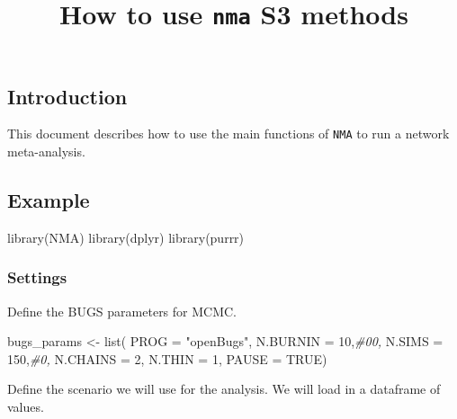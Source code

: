 \documentclass[
]{article}
\title{How to use \texttt{nma} S3 methods}
\author{}
\date{\vspace{-2.5em}}
\newenvironment{Shaded}{\begin{snugshade}}{\end{snugshade}}
\newcommand{\AttributeTok}[1]{\textcolor[rgb]{0.77,0.63,0.00}{#1}}
\newcommand{\CommentTok}[1]{\textcolor[rgb]{0.56,0.35,0.01}{\textit{#1}}}
\newcommand{\ConstantTok}[1]{\textcolor[rgb]{0.00,0.00,0.00}{#1}}
\newcommand{\DecValTok}[1]{\textcolor[rgb]{0.00,0.00,0.81}{#1}}
\newcommand{\FunctionTok}[1]{\textcolor[rgb]{0.00,0.00,0.00}{#1}}
\newcommand{\NormalTok}[1]{#1}
\newcommand{\OtherTok}[1]{\textcolor[rgb]{0.56,0.35,0.01}{#1}}
\newcommand{\StringTok}[1]{\textcolor[rgb]{0.31,0.60,0.02}{#1}}
\begin{document}
\maketitle

\hypertarget{introduction}{%
\subsection{Introduction}\label{introduction}}

This document describes how to use the main functions of \texttt{NMA} to
run a network meta-analysis.

\hypertarget{example}{%
\subsection{Example}\label{example}}

\begin{Shaded}
\begin{Highlighting}[]
\FunctionTok{library}\NormalTok{(NMA)}
\FunctionTok{library}\NormalTok{(dplyr)}
\FunctionTok{library}\NormalTok{(purrr)}
\end{Highlighting}
\end{Shaded}

\hypertarget{settings}{%
\subsubsection{Settings}\label{settings}}

Define the BUGS parameters for MCMC.

\begin{Shaded}
\begin{Highlighting}[]
\NormalTok{bugs\_params }\OtherTok{\textless{}{-}}
  \FunctionTok{list}\NormalTok{(}
    \AttributeTok{PROG =} \StringTok{"openBugs"}\NormalTok{,}
    \AttributeTok{N.BURNIN =} \DecValTok{10}\NormalTok{,}\CommentTok{\#00,}
    \AttributeTok{N.SIMS =} \DecValTok{150}\NormalTok{,}\CommentTok{\#0,}
    \AttributeTok{N.CHAINS =} \DecValTok{2}\NormalTok{,}
    \AttributeTok{N.THIN =} \DecValTok{1}\NormalTok{,}
    \AttributeTok{PAUSE =} \ConstantTok{TRUE}\NormalTok{)}
\end{Highlighting}
\end{Shaded}

Define the scenario we will use for the analysis. We will load in a
dataframe of values.
\end{document}
